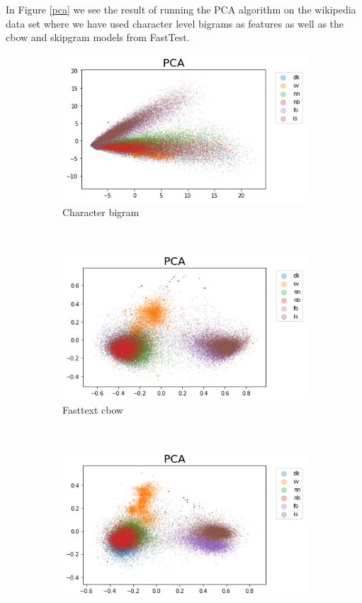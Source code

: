 In Figure \ref{pca} we see the result of running the PCA algorithm on the wikipedia data set where we have used character level bigrams as features as well as the cbow and skipgram models from FastTest.


\begin{figure}[h!]
    \centering
    \begin{subfigure}[b]{0.47\textwidth}
        \includegraphics[width=\textwidth]{figs/pcachar2}
        \caption{Character bigram}
    \end{subfigure}
    ~
    \begin{subfigure}[b]{0.47\textwidth}
        \includegraphics[width=\textwidth]{figs/pcacbow1}
        \caption{Fasttext cbow}
    \end{subfigure}
    ~
    \begin{subfigure}[b]{0.47\textwidth}
        \includegraphics[width=\textwidth]{figs/pcaskipgram1}

\end{subfigure}
\end{figure}
